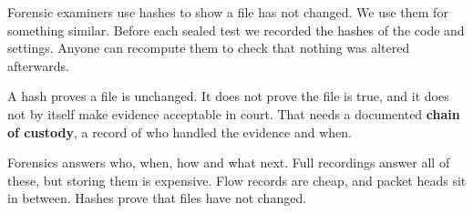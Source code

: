 Forensic examiners use hashes to show a file has not changed. We use them for something similar. Before each sealed test we recorded the hashes of the code and settings. Anyone can recompute them to check that nothing was altered afterwards.

\begin{careful}
A hash proves a file is unchanged. It does not prove the file is true, and it does not by itself make evidence acceptable in court. That needs a documented \textbf{chain of custody}, a record of who handled the evidence and when.
\end{careful}

\begin{recap}
Forensics answers who, when, how and what next. Full recordings answer all of these, but storing them is expensive. Flow records are cheap, and packet heads sit in between. Hashes prove that files have not changed.
\end{recap}
